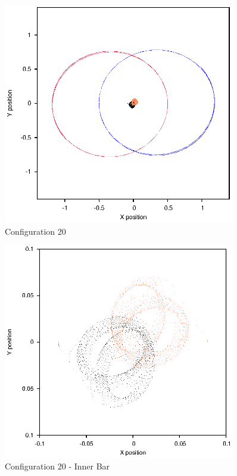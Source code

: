 \documentclass[a4paper,12pt]{article}
\begin{document}
\begin{figure}[H]
\centering
\includegraphics[width=0.9\textwidth]{./2017results/08-9-08-15/Orbit.eps}
\caption{Configuration 20}
\label{fig:config20}
\end{figure}
\begin{figure}[H]
\centering
\includegraphics[width=0.9\textwidth]{./2017results/08-9-08-15/Inner.eps}
\caption{Configuration 20 - Inner Bar}
\label{fig:config20i}
\end{figure}
\end{document}
